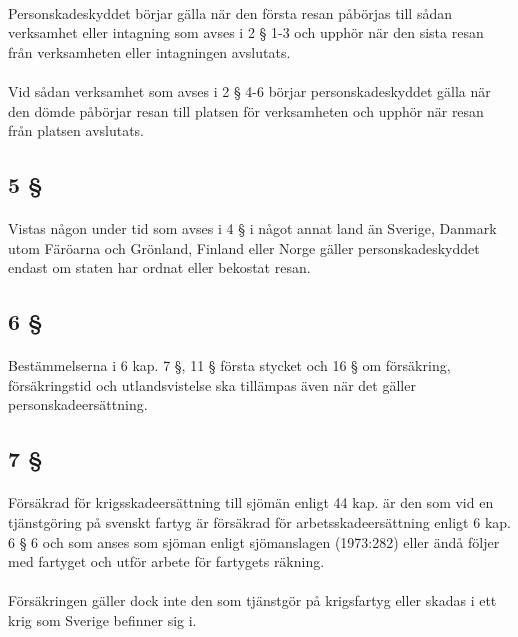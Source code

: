 \documentclass[a4paper,notitlepage,openany,10pt]{book}
\begin{document}
\paragraph*{}
Personskadeskyddet börjar gälla när den första resan påbörjas till sådan verksamhet eller intagning som avses i 2 § 1-3 och upphör när den sista resan från verksamheten eller intagningen avslutats.
\paragraph*{}
Vid sådan verksamhet som avses i 2 § 4-6 börjar personskadeskyddet gälla när den dömde påbörjar resan till platsen för verksamheten och upphör när resan från platsen avslutats.
\subsection*{5 §}
\paragraph*{}
Vistas någon under tid som avses i 4 § i något annat land än Sverige, Danmark utom Färöarna och Grönland, Finland eller Norge gäller personskadeskyddet endast om staten har ordnat eller bekostat resan.
\subsection*{6 §}
\paragraph*{}
Bestämmelserna i 6 kap. 7 §, 11 § första stycket och 16 § om försäkring, försäkringstid och utlandsvistelse ska tillämpas även när det gäller personskadeersättning.
\subsection*{7 §}
\paragraph*{}
Försäkrad för krigsskadeersättning till sjömän enligt 44 kap. är den som vid en tjänstgöring på svenskt fartyg är försäkrad för arbetsskadeersättning enligt 6 kap. 6 § 6 och som anses som sjöman enligt sjömanslagen (1973:282) eller ändå följer med fartyget och utför arbete för fartygets räkning.
\paragraph*{}
Försäkringen gäller dock inte den som tjänstgör på krigsfartyg eller skadas i ett krig som Sverige befinner sig i.
\end{document}
